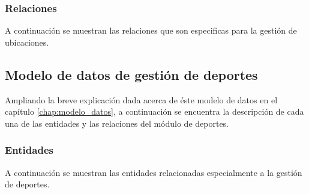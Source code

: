 \clearpage







\subsubsection{Relaciones}
A continuación se muestran las relaciones que son especificas para la gestión de ubicaciones.

\clearpage





\subsection{Modelo de datos de gestión de deportes}
Ampliando la breve explicación dada acerca de éste modelo de datos en el capítulo \ref{chap:modelo_datos}, a continuación se encuentra la descripción de cada una de las entidades y las relaciones del módulo de deportes.

\subsubsection{Entidades}
A continuación se muestran las entidades relacionadas especialmente a la gestión de deportes.

\clearpage












